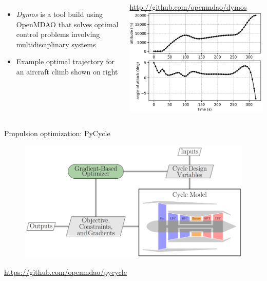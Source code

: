 \documentclass[aspectratio=169, usenames,dvipsnames, 14pt]{beamer}
\begin{document}
\begin{frame}
	\begin{columns}
			\begin{itemize}
				\item \textit{Dymos} is a tool build using OpenMDAO that solves optimal control problems involving multidisciplinary systems
				\item Example optimal trajectory for an aircraft climb shown on right
			\end{itemize}
			\url{http://github.com/openmdao/dymos}
			\includegraphics[scale=.4]{images/slide_132}
	\end{columns}
\end{frame}
			
\begin{frame}{Propulsion optimization: PyCycle}
	\begin{figure}
		\includegraphics[scale=.4]{images/slide_133.png}
	\end{figure}
	\url{https://github.com/openmdao/pycycle}
\end{frame}
\end{document}
